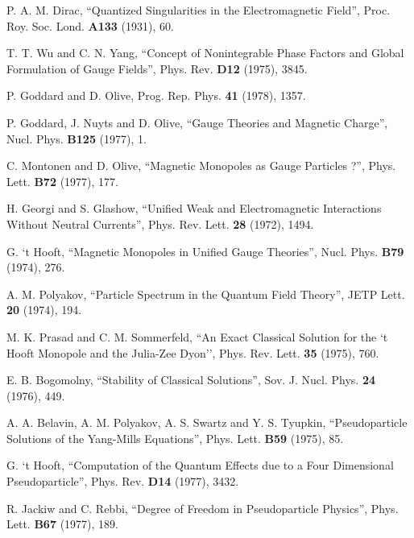 \newpage




\begin{thebibliography}{99}

 P. A. M. Dirac, ``Quantized Singularities in the 
Electromagnetic Field'', Proc. Roy. Soc. Lond. {\bf A133} (1931), 60.

 T. T. Wu and C. N. Yang, ``Concept of Nonintegrable
Phase Factors and Global Formulation of Gauge Fields'', Phys.
Rev. {\bf D12} (1975), 3845.

 P. Goddard and D. Olive, Prog. Rep. Phys. {\bf 41}
(1978), 1357.

 P. Goddard, J. Nuyts and D. Olive, ``Gauge Theories and 
Magnetic Charge'', Nucl. Phys. {\bf B125} (1977), 1.

 C. Montonen and D. Olive, ``Magnetic Monopoles as
Gauge Particles ?'', Phys. Lett. {\bf B72} (1977), 177.

 H. Georgi and S. Glashow, ``Unified Weak and Electromagnetic 
Interactions Without Neutral Currents'', Phys. Rev. Lett. {\bf 28} (1972),
1494.

 G. `t Hooft, ``Magnetic Monopoles in Unified 
Gauge Theories'', Nucl. Phys. {\bf B79} (1974), 276.

A. M. Polyakov, ``Particle Spectrum in the Quantum Field 
Theory'', JETP Lett. {\bf 20} (1974), 194.

 M. K. Prasad and C. M. Sommerfeld, ``An Exact Classical Solution for the 
`t Hooft Monopole and the Julia-Zee Dyon'', Phys. Rev. Lett. {\bf 35} (1975), 760.

 E. B. Bogomolny, ``Stability of Classical Solutions'', 
Sov. J. Nucl. Phys. {\bf 24} (1976), 449.

 A. A. Belavin, A. M. Polyakov, A. S. Swartz and
Y. S. Tyupkin, ``Pseudoparticle Solutions of the Yang-Mills
Equations'', Phys. Lett. {\bf B59} (1975), 85.

 G. `t Hooft, ``Computation of the Quantum
Effects due to a Four Dimensional Pseudoparticle'', Phys. Rev.
{\bf D14} (1977), 3432.

 R. Jackiw and C. Rebbi, ``Degree of Freedom in Pseudoparticle Physics'',
Phys. Lett. {\bf B67} (1977), 189.


\end{thebibliography}
